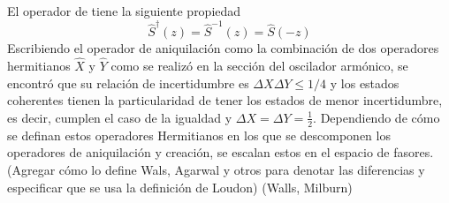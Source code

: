 El operador de tiene la siguiente propiedad
\begin{equation*}
  \hat{S}^{\dagger}(z) = \hat{S}^{-1}(z) = \hat{S}(-z)
\end{equation*}
Escribiendo el operador de aniquilación como la combinación de dos operadores hermitianos $\hat{X}$ y $\hat{Y}$ como se realizó en la sección del oscilador armónico, se encontró que su relación de incertidumbre es $\Delta X \Delta Y \leq 1/4$ y los estados coherentes tienen la particularidad de tener los estados de menor incertidumbre, es decir, cumplen el caso de la igualdad y $\Delta X = \Delta Y = \frac{1}{2}$. Dependiendo de cómo se definan estos operadores Hermitianos en los que se descomponen los operadores de aniquilación y creación, se escalan estos en el espacio de fasores. (Agregar cómo lo define Wals, Agarwal y otros para denotar las diferencias y especificar que se usa la definición de Loudon)
(Walls, Milburn)